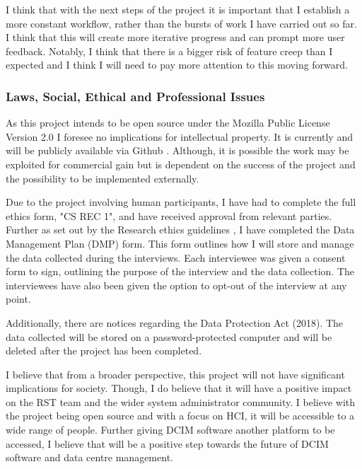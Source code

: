 \documentclass [11pt,a4paper]{article}
\begin{document}
I think that with the next steps of the project it is important that I establish a more constant workflow, rather than the bursts of work I have carried out so far. I think that this will create more iterative progress and can prompt more user feedback. Notably, I think that there is a bigger risk of feature creep than I expected and I think I will need to pay more attention to this moving forward.

\subsubsection{Laws, Social, Ethical and Professional Issues}
\label{sec:computer_laws}
As this project intends to be open source under the Mozilla Public License Version 2.0 I foresee no implications for intellectual property. It is currently and will be publicly available via Github \cite{keeptrackgithub}. Although, it is possible the work may be exploited for commercial gain but is dependent on the success of the project and the possibility to be implemented externally.

Due to the project involving human participants, I have had to complete the full ethics form, "CS REC 1", and have received approval from relevant parties. Further as set out by the Research ethics guidelines \cite{ethicsguidelines}, I have completed the Data Management Plan (DMP) form. This form outlines how I will store and manage the data collected during the interviews. Each interviewee was given a consent form to sign, outlining the purpose of the interview and the data collection. The interviewees have also been given the option to opt-out of the interview at any point.

Additionally, there are notices regarding the Data Protection Act (2018). The data collected will be stored on a password-protected computer and will be deleted after the project has been completed.

I believe that from a broader perspective, this project will not have significant implications for society. Though, I do believe that it will have a positive impact on the RST team and the wider system administrator community. I believe with the project being open source and with a focus on HCI, it will be accessible to a wide range of people. Further giving DCIM software another platform to be accessed, I believe that will be a positive step towards the future of DCIM software and data centre management.

\pagebreak


 
\end{document}
